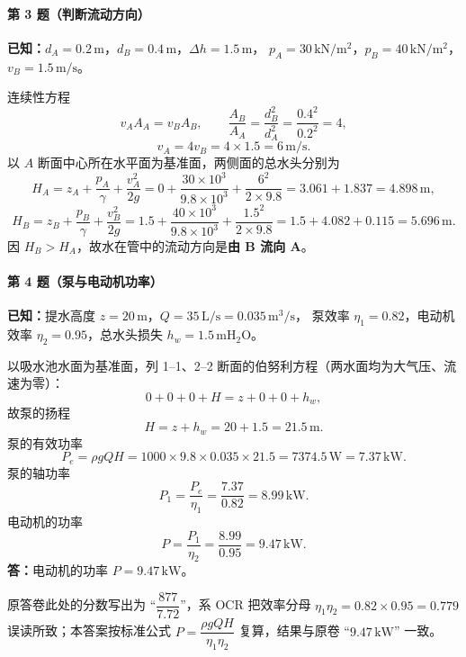 \paragraph{第 3 题（判断流动方向）}
\begin{jie}
\textbf{已知：}$d_A=0.2\,\mathrm{m}$，$d_B=0.4\,\mathrm{m}$，$\Delta h=1.5\,\mathrm{m}$，
$p_A=30\,\mathrm{kN/m^2}$，$p_B=40\,\mathrm{kN/m^2}$，$v_B=1.5\,\mathrm{m/s}$。

连续性方程
\[
v_A A_A=v_B A_B,\qquad
\frac{A_B}{A_A}=\frac{d_B^{2}}{d_A^{2}}=\frac{0.4^{2}}{0.2^{2}}=4,
\]
\[
v_A=4v_B=4\times1.5=6\,\mathrm{m/s}.
\]
以 $A$ 断面中心所在水平面为基准面，两侧面的总水头分别为
\[
H_A=z_A+\frac{p_A}{\gamma}+\frac{v_A^{2}}{2g}
=0+\frac{30\times10^{3}}{9.8\times10^{3}}+\frac{6^{2}}{2\times9.8}
=3.061+1.837=4.898\,\mathrm{m},
\]
\[
H_B=z_B+\frac{p_B}{\gamma}+\frac{v_B^{2}}{2g}
=1.5+\frac{40\times10^{3}}{9.8\times10^{3}}+\frac{1.5^{2}}{2\times9.8}
=1.5+4.082+0.115=5.696\,\mathrm{m}.
\]
因 $H_B>H_A$，故水在管中的流动方向是\textbf{由 B 流向 A}。
\end{jie}

\paragraph{第 4 题（泵与电动机功率）}
\begin{jie}
\textbf{已知：}提水高度 $z=20\,\mathrm{m}$，$Q=35\,\mathrm{L/s}=0.035\,\mathrm{m^3/s}$，
泵效率 $\eta_1=0.82$，电动机效率 $\eta_2=0.95$，总水头损失 $h_w=1.5\,\mathrm{mH_2O}$。

以吸水池水面为基准面，列 1--1、2--2 断面的伯努利方程（两水面均为大气压、流速为零）：
\[
0+0+0+H=z+0+0+h_w ,
\]
故泵的扬程
\[
H=z+h_w=20+1.5=21.5\,\mathrm{m}.
\]
泵的有效功率
\[
P_e=\rho gQH=1000\times9.8\times0.035\times21.5=7374.5\,\mathrm{W}=7.37\,\mathrm{kW}.
\]
泵的轴功率
\[
P_1=\frac{P_e}{\eta_1}=\frac{7.37}{0.82}=8.99\,\mathrm{kW}.
\]
电动机的功率
\[
P=\frac{P_1}{\eta_2}=\frac{8.99}{0.95}=9.47\,\mathrm{kW}.
\]
\textbf{答：}电动机的功率 $P=9.47\,\mathrm{kW}$。
\end{jie}

\begin{tishi}
原答卷此处的分数写出为 ``$\dfrac{877}{7.72}$''，系 OCR 把效率分母 $\eta_1\eta_2=0.82\times0.95=0.779$
误读所致；本答案按标准公式 $P=\dfrac{\rho gQH}{\eta_1\eta_2}$ 复算，结果与原卷 ``$9.47\,\mathrm{kW}$'' 一致。
\end{tishi}

